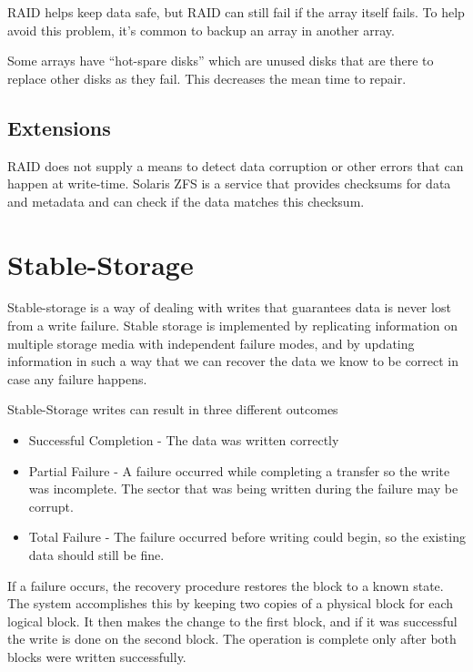 \documentclass{article}
\begin{document}
RAID helps keep data safe, but RAID can still fail if the array itself fails.
To help avoid this problem, it's common to backup an array in another array.

Some arrays have ``hot-spare disks'' which are unused disks that are there to
replace other disks as they fail. This decreases the mean time to repair.

\subsection{Extensions}
RAID does not supply a means to detect data corruption or other errors that can
happen at write-time. Solaris ZFS is a service that provides checksums for
data and metadata and can check if the data matches this checksum.

\section{Stable-Storage}
Stable-storage is a way of dealing with writes that guarantees data is never
lost from a write failure. Stable storage is implemented by replicating
information on multiple storage media with independent failure modes, and by
updating information in such a way that we can recover the data we know to be
correct in case any failure happens.

Stable-Storage writes can result in three different outcomes

\begin{itemize}
	\item Successful Completion - The data was written correctly
	\item Partial Failure - A failure occurred while completing a transfer
	      so the write was incomplete. The sector that was being written
	      during the failure may be corrupt.
	\item Total Failure - The failure occurred before writing could begin,
	      so the existing data should still be fine.
\end{itemize}

If a failure occurs, the recovery procedure restores the block to a known
state. The system accomplishes this by keeping two copies of a physical block
for each logical block. It then makes the change to the first block, and if it
was successful the write is done on the second block. The operation is complete
only after both blocks were written successfully.
\end{document}
